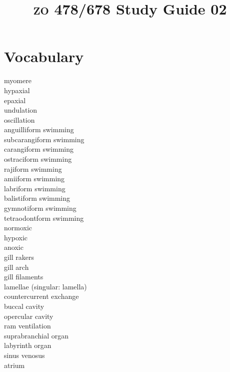 \documentclass[letterpaper]{tufte-handout}
\title{{\scshape zo} 478/678 Study Guide 02}
\date{} %
\begin{document}
\maketitle	%


\section{Vocabulary} 
\vspace{-1\baselineskip}
\begin{multicols}{2}
myomere\\
hypaxial\\
epaxial\\
undulation \\
oscillation \\
anguilliform swimming \\
subcarangiform swimming \\
carangiform swimming \\
ostraciform swimming \\
rajiform swimming \\
amiiform swimming  \\
labriform swimming \\
balistiform swimming \\
gymnotiform swimming \\
tetraodontform swimming \\
normoxic \\
hypoxic \\
anoxic \\
gill rakers \\
gill arch \\
gill filaments \\
lamellae (singular: lamella) \\
countercurrent exchange \\
buccal cavity \\
opercular cavity \\
ram ventilation \\
suprabranchial organ \\
labyrinth organ \\
sinus venosus \\
atrium \\

\end{multicols}
\end{document}
